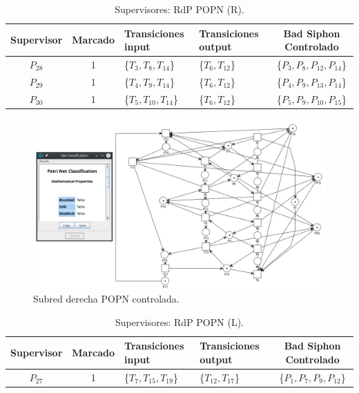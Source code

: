 \begin{table}[H]
    \centering
    \begin{tabular}{|c|c|P{2.2cm}|P{2.2cm}|c|}
    \hline
    \textbf{Supervisor} & \textbf{Marcado} & \textbf{Transiciones input} & \textbf{Transiciones output} & \textbf{Bad Siphon Controlado}  \\  \hline
    $P_{28}$ & 1 & \{$T_{3}, T_{8}, T_{14}$\} & \{$T_{6}, T_{12}$\} & \{$P_3,P_{8},P_{12},P_{14}$\} \\
    \hline
    $P_{29}$ & 1 & \{$T_{4}, T_{9}, T_{14}$\} & \{$T_{6}, T_{12}$\} & \{$P_4,P_{9},P_{13},P_{14}$\} \\
    \hline
    $P_{30}$ & 1 & \{$T_{5}, T_{10}, T_{14}$\} & \{$T_{6}, T_{12}$\} & 
    \{$P_5,P_{9},P_{10},P_{15}$\} \\ 
    \hline
    \end{tabular}
    \label{tab:popnderecha}
    \caption{Supervisores: RdP POPN (R).}
    \end{table}
\bigskip

\begin{figure}[H]
	\centering
	\includegraphics[scale=0.5]{Figures/algoritmo3/POP4.png}
	\caption{ Subred derecha POPN controlada.}
	\label{fig:popnreddercontrolada}
 \end{figure}
\bigskip

\begin{table}[H]
    \centering
    \begin{tabular}{|c|c|P{2.2cm}|P{2.2cm}|c|}
    \hline
    \textbf{Supervisor} & \textbf{Marcado} & \textbf{Transiciones input} & \textbf{Transiciones output} & \textbf{Bad Siphon Controlado}  \\  \hline
    $P_{27}$ & 1 & \{$T_{7}, T_{15}, T_{19}$\} & \{$T_{12}, T_{17}$\} & \{$P_1,P_{7},P_{9},P_{12}$\} \\ 
    \hline
    \end{tabular}
    \label{tab:popnizq}
    \caption{Supervisores: RdP POPN (L).}
    \end{table}

